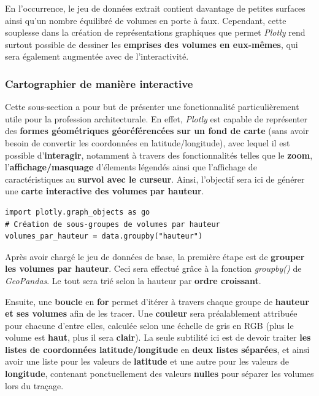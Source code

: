 \documentclass[
  11pt,
  french,
]{article}
\begin{document}
En l'occurrence, le jeu de données extrait contient davantage de petites
surfaces ainsi qu'un nombre équilibré de volumes en porte à faux.
Cependant, cette souplesse dans la création de représentations
graphiques que permet \emph{Plotly} rend surtout possible de dessiner
les \textbf{emprises des volumes en eux-mêmes}, qui sera également
augmentée avec de l'interactivité.

\newpage

\hypertarget{cartographier-de-maniuxe8re-interactive}{%
\subsubsection{Cartographier de manière
interactive}\label{cartographier-de-maniuxe8re-interactive}}

Cette sous-section a pour but de présenter une fonctionnalité
particulièrement utile pour la profession architecturale. En effet,
\emph{Plotly} est capable de représenter des \textbf{formes géométriques
géoréférencées sur un fond de carte} (sans avoir besoin de convertir les
coordonnées en latitude/longitude), avec lequel il est possible
d'\textbf{interagir}, notamment à travers des fonctionnalités telles que
le \textbf{zoom}, l'\textbf{affichage/masquage} d'élements légendés
ainsi que l'affichage de caractéristiques au \textbf{survol avec le
curseur}. Ainsi, l'objectif sera ici de générer une \textbf{carte
interactive des volumes par hauteur}.

\begin{tcolorbox}[title= Import de Plotly et tri des volumes par hauteur ,colback=boitecode]
\begin{lstlisting}[style=code]
import plotly.graph_objects as go
# Création de sous-groupes de volumes par hauteur
volumes_par_hauteur = data.groupby("hauteur")\end{lstlisting}
\end{tcolorbox}

Après avoir chargé le jeu de données de base, la première étape est de
\textbf{grouper les volumes par hauteur}. Ceci sera effectué grâce à la
fonction \emph{groupby()} de \emph{GeoPandas}. Le tout sera trié selon
la hauteur par \textbf{ordre croissant}.

Ensuite, une \textbf{boucle} en \textbf{for} permet d'itérer à travers
chaque groupe de \textbf{hauteur et ses volumes} afin de les tracer. Une
\textbf{couleur} sera préalablement attribuée pour chacune d'entre
elles, calculée selon une échelle de gris en RGB (plus le volume est
\textbf{haut}, plus il sera \textbf{clair}). La seule subtilité ici est
de devoir traiter \textbf{les listes de coordonnées latitude/longitude}
en \textbf{deux listes séparées}, et ainsi avoir une liste pour les
valeurs de \textbf{latitude} et une autre pour les valeurs de
\textbf{longitude}, contenant ponctuellement des valeurs \textbf{nulles}
pour séparer les volumes lors du traçage.\\
\end{document}
